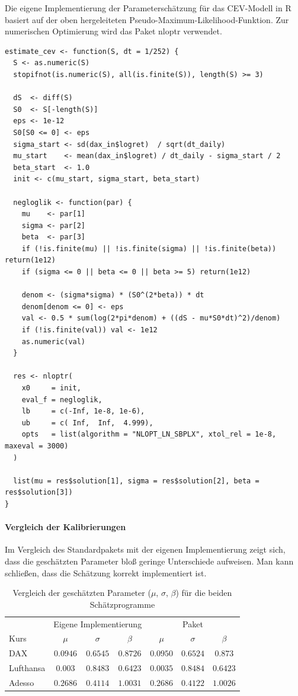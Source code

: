 \begin{bsp}
Die eigene Implementierung der Parameterschätzung für das CEV-Modell in R basiert auf der oben hergeleiteten Pseudo-Maximum-Likelihood-Funktion.
Zur numerischen Optimierung wird das Paket nloptr \cite{nlopt} verwendet.

\begin{lstlisting}
estimate_cev <- function(S, dt = 1/252) {
  S <- as.numeric(S)
  stopifnot(is.numeric(S), all(is.finite(S)), length(S) >= 3)
  
  dS  <- diff(S)
  S0  <- S[-length(S)]
  eps <- 1e-12
  S0[S0 <= 0] <- eps
  sigma_start <- sd(dax_in$logret)  / sqrt(dt_daily)
  mu_start    <- mean(dax_in$logret) / dt_daily - sigma_start / 2
  beta_start  <- 1.0
  init <- c(mu_start, sigma_start, beta_start) 
  
  negloglik <- function(par) {
    mu    <- par[1]
    sigma <- par[2]
    beta  <- par[3]
    if (!is.finite(mu) || !is.finite(sigma) || !is.finite(beta)) return(1e12)
    if (sigma <= 0 || beta <= 0 || beta >= 5) return(1e12)
    
    denom <- (sigma*sigma) * (S0^(2*beta)) * dt
    denom[denom <= 0] <- eps
    val <- 0.5 * sum(log(2*pi*denom) + ((dS - mu*S0*dt)^2)/denom)
    if (!is.finite(val)) val <- 1e12
    as.numeric(val)
  }
  
  res <- nloptr(
    x0     = init,
    eval_f = negloglik,
    lb     = c(-Inf, 1e-8, 1e-6),
    ub     = c( Inf,  Inf,  4.999),
    opts   = list(algorithm = "NLOPT_LN_SBPLX", xtol_rel = 1e-8, maxeval = 3000)
  )
  
  list(mu = res$solution[1], sigma = res$solution[2], beta = res$solution[3])
}
\end{lstlisting}


\paragraph{Vergleich der Kalibrierungen}
Im Vergleich des Standardpakets mit der eigenen Implementierung zeigt sich, dass die geschätzten Parameter bloß geringe Unterschiede aufweisen. Man kann schließen, dass die Schätzung korrekt implementiert ist.

\begin{table}[H]
\centering
\caption{Vergleich der geschätzten Parameter ($\mu$, $\sigma$, $\beta$) für die beiden Schätzprogramme}
\label{tab:compare_models_ab}
\begin{tabular}{lcccccc}
\hline
 & \multicolumn{3}{c}{Eigene Implementierung} & \multicolumn{3}{c}{Paket} \\
\cline{2-4}\cline{5-7}
Kurs & $\mu$ & $\sigma$ & $\beta$ & $\mu$ & $\sigma$ & $\beta$ \\
\hline
DAX & $0.0946$ & $0.6545$ & $0.8726$ & $0.0950$ & $0.6524$ & $0.873$ \\
Lufthansa & $0.003$ & $0.8483$ & $0.6423$ & $0.0035$ & $0.8484$ & $0.6423$ \\
Adesso & $0.2686$ & $0.4114$ & $1.0031$ & $0.2686$ & $0.4122$ & $1.0026$ \\
\hline
\end{tabular}
\end{table}
\end{bsp}

